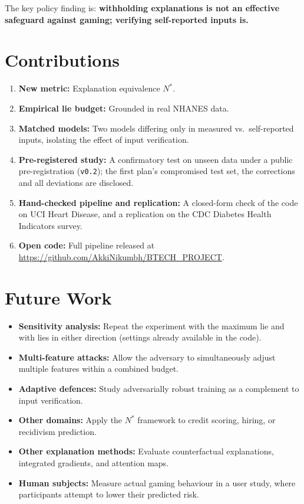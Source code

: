 \documentclass[12pt, a4paper, oneside]{report}
\theoremstyle{definition}
\begin{document}
The key policy finding is: \textbf{withholding explanations is not an
effective safeguard against gaming; verifying self-reported inputs is.}

\section{Contributions}

\begin{enumerate}
  \item \textbf{New metric:} Explanation equivalence $N^*$.
  \item \textbf{Empirical lie budget:} Grounded in real NHANES data.
  \item \textbf{Matched models:} Two models differing only in measured vs.\
        self-reported inputs, isolating the effect of input verification.
  \item \textbf{Pre-registered study:} A confirmatory test on unseen
        data under a public pre-registration (\texttt{v0.2}); the first
        plan's compromised test set, the corrections and all deviations
        are disclosed.
  \item \textbf{Hand-checked pipeline and replication:} A closed-form
        check of the code on UCI Heart Disease, and a replication on the
        CDC Diabetes Health Indicators survey.
  \item \textbf{Open code:} Full pipeline released at \url{https://github.com/AkkiNikumbh/BTECH_PROJECT}.
\end{enumerate}

\section{Future Work}

\begin{itemize}
  \item \textbf{Sensitivity analysis:} Repeat the experiment with the
        maximum lie and with lies in either direction (settings already
        available in the code).
  \item \textbf{Multi-feature attacks:} Allow the adversary to simultaneously
        adjust multiple features within a combined budget.
  \item \textbf{Adaptive defences:} Study adversarially robust training as
        a complement to input verification.
  \item \textbf{Other domains:} Apply the $N^*$ framework to credit scoring,
        hiring, or recidivism prediction.
  \item \textbf{Other explanation methods:} Evaluate counterfactual
        explanations, integrated gradients, and attention maps.
  \item \textbf{Human subjects:} Measure actual gaming behaviour in a user
        study, where participants attempt to lower their predicted risk.
\end{itemize}
\end{document}
